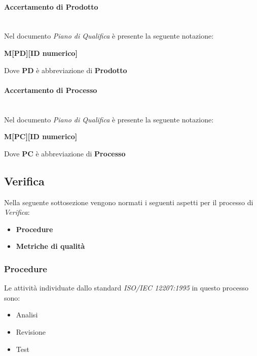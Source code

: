 \paragraph{Accertamento di Prodotto}
\mbox{}\\
Nel documento \textit{Piano di Qualifica} è presente la seguente notazione:
\begin{center}
    \textbf{M[PD][ID numerico]}
\end{center}
Dove \textbf{PD} è abbreviazione di \textbf{Prodotto}

\paragraph{Accertamento di Processo}
\mbox{}\\
Nel documento \textit{Piano di Qualifica} è presente la seguente notazione:
\begin{center}
    \textbf{M[PC][ID numerico]}
\end{center}
Dove \textbf{PC} è abbreviazione di \textbf{Processo}


\subsection{Verifica}
\label{sec:Verifica}
Nella seguente sottosezione vengono normati i seguenti aspetti per il
processo di \textit{Verifica}:
\begin{itemize}
    \item \textbf{Procedure}
    \item \textbf{Metriche di qualità}
\end{itemize}

\subsubsection{Procedure}
Le attività individuate dallo standard \textit{ISO/IEC 12207:1995} in questo processo sono:
\begin{itemize}
    \item Analisi
    \item Revisione
    \item Test
\end{itemize}

